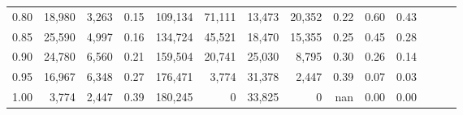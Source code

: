 \begin{tabular}{rrrrrrrrrrrrrr}
0.80 &  18,980 &  3,263 &  0.15 &  109,134 &   71,111 &  13,473 &  20,352 &  0.22 &  0.60 &      0.43 \\
0.85 &  25,590 &  4,997 &  0.16 &  134,724 &   45,521 &  18,470 &  15,355 &  0.25 &  0.45 &      0.28 \\
0.90 &  24,780 &  6,560 &  0.21 &  159,504 &   20,741 &  25,030 &   8,795 &  0.30 &  0.26 &      0.14 \\
0.95 &  16,967 &  6,348 &  0.27 &  176,471 &    3,774 &  31,378 &   2,447 &  0.39 &  0.07 &      0.03 \\
1.00 &   3,774 &  2,447 &  0.39 &  180,245 &        0 &  33,825 &       0 &   nan &  0.00 &      0.00 \\
\bottomrule
\end{tabular}

